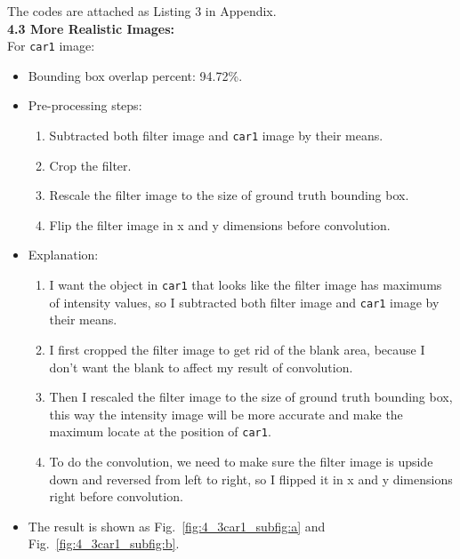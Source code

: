 \documentclass{assignment}
\begin{document}
\begin{problemlist}
The codes are attached as Listing 3 in Appendix.\\

\textbf{4.3 More Realistic Images:}\\
For \texttt{car1} image:
\begin{itemize}
    \item Bounding box overlap percent: 94.72\%.
    \item Pre-processing steps: 
    \begin{enumerate}[label={\alph*)}]
        \item Subtracted both filter image and \texttt{car1} image by their means.
        \item Crop the filter.
        \item Rescale the filter image to the size of ground truth bounding box.
        \item Flip the filter image in x and y dimensions before convolution.
    \end{enumerate}
    \item Explanation: 
    \begin{enumerate}[label={\alph*)}]
        \item I want the object in \texttt{car1} that looks like the filter image has maximums of intensity values, so I subtracted both filter image and \texttt{car1} image by their means.
        \item I first cropped the filter image to get rid of the blank area, because I don't want the blank to affect my result of convolution.
        \item Then I rescaled the filter image to the size of ground truth bounding box, this way the intensity image will be more accurate and make the maximum locate at the position of \texttt{car1}.
        \item To do the convolution, we need to make sure the filter image is upside down and reversed from left to right, so I flipped it in x and y dimensions right before convolution.
    \end{enumerate}
    \item The result is shown as Fig.~\ref{fig:4_3car1_subfig:a} and Fig.~\ref{fig:4_3car1_subfig:b}.
\end{itemize}


\end{problemlist}
\end{document}
